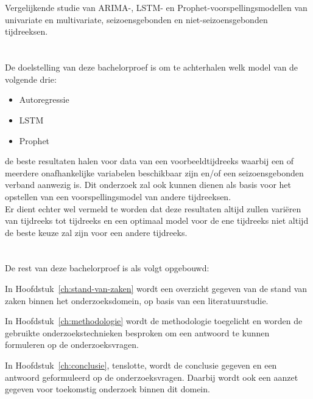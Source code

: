 \section{}
\label{sec:onderzoeksvraag}

Vergelijkende studie van ARIMA-, LSTM- en Prophet-voorspellingsmodellen van univariate en multivariate, seizoensgebonden en niet-seizoensgebonden tijdreeksen.
\clearpage
\section{}
\label{sec:onderzoeksdoelstelling}

De doelstelling van deze bachelorproef is om te achterhalen welk model van de volgende drie:
\begin{itemize}
    \item Autoregressie
    \item LSTM
    \item Prophet
\end{itemize}
 de beste resultaten halen voor data van een voorbeeldtijdreeks waarbij een of meerdere onafhankelijke variabelen beschikbaar zijn en/of een seizoensgebonden verband aanwezig is. Dit onderzoek zal ook kunnen dienen als basis voor het opstellen van een voorspellingsmodel van andere tijdreeksen. \\
 
 Er dient echter wel vermeld te worden dat deze resultaten altijd zullen vari\"{e}ren van tijdreeks tot tijdreeks en een optimaal model voor de ene tijdreeks niet altijd de beste keuze zal zijn voor een andere tijdreeks.

\section{}
\label{sec:opzet-bachelorproef}


De rest van deze bachelorproef is als volgt opgebouwd:

In Hoofdstuk~\ref{ch:stand-van-zaken} wordt een overzicht gegeven van de stand van zaken binnen het onderzoeksdomein, op basis van een literatuurstudie.

In Hoofdstuk~\ref{ch:methodologie} wordt de methodologie toegelicht en worden de gebruikte onderzoekstechnieken besproken om een antwoord te kunnen formuleren op de onderzoeksvragen.


In Hoofdstuk~\ref{ch:conclusie}, tenslotte, wordt de conclusie gegeven en een antwoord geformuleerd op de onderzoeksvragen. Daarbij wordt ook een aanzet gegeven voor toekomstig onderzoek binnen dit domein.